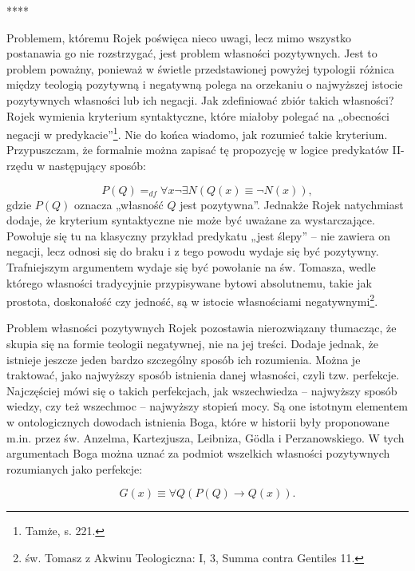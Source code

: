 ****

Problemem, któremu Rojek poświęca nieco uwagi, lecz mimo wszystko
postanawia go nie rozstrzygać, jest problem własności pozytywnych. Jest
to problem poważny, ponieważ w świetle przedstawionej powyżej typologii
różnica między teologią pozytywną i negatywną polega na orzekaniu o
najwyższej istocie pozytywnych własności lub ich negacji. Jak
zdefiniować zbiór takich własności? Rojek wymienia kryterium
syntaktyczne, które miałoby polegać na „obecności negacji w
predykacie”\footnote{Tamże, s. 221. }. Nie do końca wiadomo, jak
rozumieć takie kryterium. Przypuszczam, że formalnie można zapisać tę
propozycję w logice predykatów II-rzędu w następujący sposób:

\begin{equation}
    P(Q) {=}_{df} \forall x \neg \exists N (Q(x) \equiv \neg N(x)),
\end{equation}
gdzie $P(Q)$ oznacza „własność $Q$ jest pozytywna”. Jednakże Rojek
natychmiast dodaje, że kryterium syntaktyczne nie może być uważane za
wystarczające. Powołuje się tu na klasyczny przykład predykatu „jest
ślepy” -- nie zawiera on negacji, lecz odnosi się do braku i z tego
powodu wydaje się być pozytywny. Trafniejszym argumentem wydaje się być
powołanie na św. Tomasza, wedle którego własności tradycyjnie
przypisywane bytowi absolutnemu, takie jak prostota, doskonałość czy
jedność, są w istocie własnościami negatywnymi\footnote{św. Tomasz z
Akwinu Teologiczna: I, 3, Summa contra Gentiles 11. }.

Problem własności pozytywnych Rojek pozostawia nierozwiązany tłumacząc,
że skupia się na formie teologii negatywnej, nie na jej treści. Dodaje
jednak, że istnieje jeszcze jeden bardzo szczególny sposób ich
rozumienia. Można je traktować, jako najwyższy sposób istnienia danej
własności, czyli tzw. perfekcje. Najczęściej mówi się o takich
perfekcjach, jak wszechwiedza -- najwyższy sposób wiedzy, czy też
wszechmoc -- najwyższy stopień mocy. Są one istotnym elementem w
ontologicznych dowodach istnienia Boga, które w historii były
proponowane m.in. przez św. Anzelma, Kartezjusza, Leibniza, Gödla i
Perzanowskiego. W tych argumentach Boga można uznać za podmiot
wszelkich własności pozytywnych rozumianych jako perfekcje:

\begin{equation}
    G(x) \equiv \forall Q (P(Q) \to Q(x)).
\end{equation}


